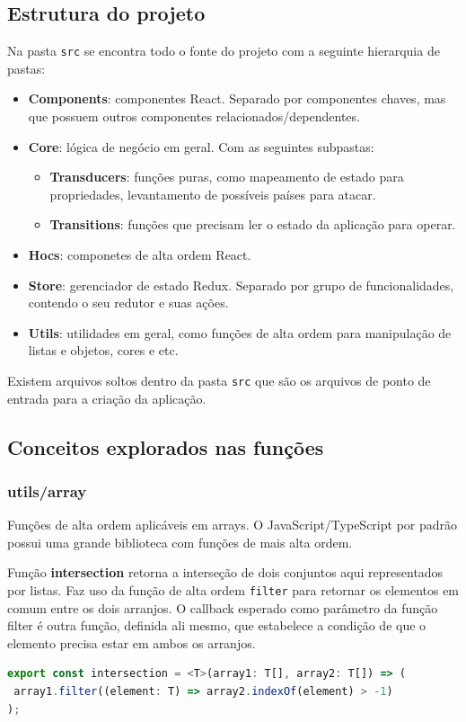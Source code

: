 \documentclass[rel_mlp]{iiufrgs}
\begin{document}
\subsection{Estrutura do projeto}
Na pasta \verb|src| se encontra todo o fonte do projeto com a seguinte hierarquia de pastas:
\begin{itemize}
  \item \textbf{Components}: componentes React. Separado por componentes chaves, mas que possuem outros componentes relacionados/dependentes.
  \item \textbf{Core}: lógica de negócio em geral. Com as seguintes subpastas:
    \begin{itemize}
      \item \textbf{Transducers}: funções puras, como mapeamento de estado para propriedades, levantamento de possíveis países para atacar.
      \item \textbf{Transitions}: funções que precisam ler o estado da aplicação para operar.
    \end{itemize}
  \item \textbf{Hocs}: componetes de alta ordem React.
  \item \textbf{Store}: gerenciador de estado Redux. Separado por grupo de funcionalidades, contendo o seu redutor e suas ações.
  \item \textbf{Utils}: utilidades em geral, como funções de alta ordem para manipulação de listas e objetos, cores e etc.
\end{itemize}

\par Existem arquivos soltos dentro da pasta \verb|src| que são os arquivos de ponto de entrada para a criação da aplicação.



\subsection{Conceitos explorados nas funções}
\subsubsection{utils/array}
Funções de alta ordem aplicáveis em arrays. O JavaScript/TypeScript por padrão possui uma grande biblioteca com funções de mais alta ordem.


Função \textbf{intersection} retorna a interseção de dois conjuntos aqui representados por listas. Faz uso da função de alta ordem \verb|filter| para retornar os elementos em comum entre os dois arranjos. O callback esperado como parâmetro da função filter é outra função, definida ali mesmo, que estabelece a condição de que o elemento precisa estar em ambos os arranjos.
\begin{lstlisting}[language = JavaScript]
export const intersection = <T>(array1: T[], array2: T[]) => (
 array1.filter((element: T) => array2.indexOf(element) > -1)
);
\end{lstlisting}
\end{document}
